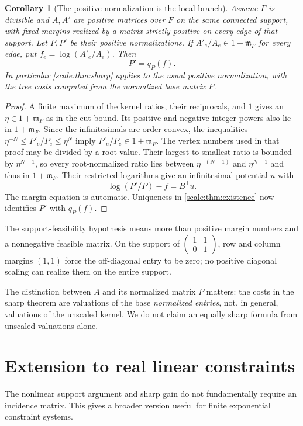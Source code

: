 \documentclass[11pt,a4paper]{article}
\numberwithin{equation}{section}
\newtheorem{corollary}[theorem]{Corollary}
\theoremstyle{definition}
\newcommand{\mm}{\mathfrak m}
\begin{document}
\begin{corollary}[The positive normalization is the local branch]
\label{scale:cor:positivebranch}
Assume $\Gamma$ is divisible and $A,A'$ are positive matrices over
$F$ on the same connected support, with fixed margins realized by a matrix
strictly positive on every edge of that support. Let $P,P'$ be their
positive normalizations.
If $A'_e/A_e\in1+\mm_F$ for every edge, put
$f_e=\log(A'_e/A_e)$. Then
\[
 P'=q_P(f).
\]
In particular \cref{scale:thm:sharp} applies to the usual positive
normalization, with the tree costs computed from the normalized
base matrix $P$.
\end{corollary}
\begin{proof}
A finite maximum of the kernel ratios, their reciprocals, and $1$
gives an $\eta\in1+\mm_F$ as in the cut bound. Its positive and
negative integer powers also lie in $1+\mm_F$. Since the infinitesimals
are order-convex, the inequalities
$\eta^{-N}\leq P'_e/P_e\leq\eta^N$ imply
$P'_e/P_e\in1+\mm_F$. The vertex numbers used in that proof may
be divided by a root value. Their largest-to-smallest ratio is bounded by
$\eta^{N-1}$, so every root-normalized ratio lies between
$\eta^{-(N-1)}$ and $\eta^{N-1}$ and thus in $1+\mm_F$.
Their restricted logarithms give an infinitesimal
potential $u$ with
\[
 \log(P'/P)-f=B^{\mathsf T}u.
\]
The margin equation is automatic. Uniqueness in
\cref{scale:thm:existence} now identifies $P'$ with $q_P(f)$.
\end{proof}
The support-feasibility hypothesis means more than positive margin numbers
and a nonnegative feasible matrix. On the support of
$\left(\begin{smallmatrix}1&1\\0&1\end{smallmatrix}\right)$, row and
column margins $(1,1)$ force the off-diagonal entry to be zero; no positive
diagonal scaling can realize them on the entire support.

The distinction between $A$ and its normalized matrix $P$ matters:
the costs in the sharp theorem are valuations of the base
\emph{normalized entries}, not, in general, valuations of the
unscaled kernel. We do not claim an equally sharp formula from
unscaled valuations alone.

\section{Extension to real linear constraints}\label{scale:sec:linear}
The nonlinear support argument and sharp gain do not fundamentally
require an incidence matrix. This gives a broader version useful
for finite exponential constraint systems.
\end{document}
